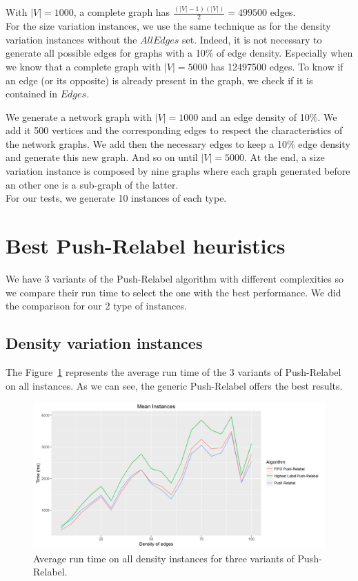With $|V|=1000$, a complete graph has $\frac{(|V|-1)(|V|)}{2} = 499500$ edges.\\

For the size variation instances, we use the same technique as for the density variation instances without the $AllEdges$ set. Indeed, it is not necessary to generate all possible edges for graphs with a 10\% of edge density. Especially when we know that a complete graph with $|V|=5000$ has 12497500 edges. To know if an edge (or its opposite) is already present in the graph, we check if it is contained in $Edges$.

We generate a network graph with $|V|=1000$ and an edge density of 10\%. We add it 500 vertices and the corresponding edges to respect the characteristics of the network graphs. We add then the necessary edges to keep a 10\% edge density and generate this new graph. And so on until $|V|=5000$. At the end, a size variation instance is composed by nine graphs where each graph generated before an other one is a sub-graph of the latter. \\

For our tests, we generate 10 instances of each type.

\section{Best Push-Relabel heuristics}
We have 3 variants of the Push-Relabel algorithm with different complexities so we compare their run time to select the one with the best performance. We did the comparison for our 2 type of instances.

\subsection{Density variation instances}
The Figure~\ref{fig:PRs} represents the average run time of the 3 variants of Push-Relabel on all instances. As we can see, the generic Push-Relabel offers the best results.
\begin{figure}[H]
\includegraphics[scale=0.5]{images/meanPRs.png}
\caption{Average run time on all density instances for three variants of Push-Relabel.}
\label{fig:PRs}
\end{figure}
